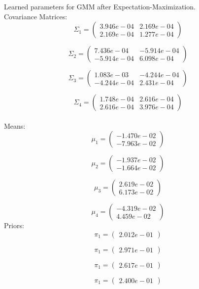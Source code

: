 \documentclass[conference]{IEEEtran}
\begin{document}
\begin{flushleft}
Learned parameters for GMM after Expectation-Maximization.\\

Covariance Matrices:
$$
\Sigma_1 =
 \begin{pmatrix}
    3.946e-04 & 2.169e-04\\
	2.169e-04 & 1.277e-04
 \end{pmatrix}
$$

$$
\Sigma_2 =
 \begin{pmatrix}
    7.436e-04 & -5.914e-04\\
	-5.914e-04 & 6.098e-04
 \end{pmatrix}
$$

$$
\Sigma_3 =
 \begin{pmatrix}
	1.083e-03 & -4.244e-04\\
	-4.244e-04 & 2.431e-04
 \end{pmatrix}
$$

$$
\Sigma_4 =
 \begin{pmatrix}
	1.748e-04 & 2.616e-04\\
	2.616e-04 & 3.976e-04
 \end{pmatrix}
$$
\\
Means:
$$
\mu_1 =
 \begin{pmatrix}
	-1.470e-02 \\ -7.963e-02
 \end{pmatrix}
$$

$$
\mu_2 =
 \begin{pmatrix}
	-1.937e-02 \\ -1.664e-02
 \end{pmatrix}
$$

$$
\mu_3 =
 \begin{pmatrix}
	2.619e-02 \\ 6.173e-02
 \end{pmatrix}
$$

$$
\mu_4 =
 \begin{pmatrix}
	-4.319e-02 \\ 4.459e-02
 \end{pmatrix}
$$
Priors:
$$ \pi_1 = \begin{pmatrix} 2.012e-01 \end{pmatrix} $$

$$ \pi_1 = \begin{pmatrix} 2.971e-01 \end{pmatrix} $$

$$ \pi_1 = \begin{pmatrix} 2.617e-01 \end{pmatrix} $$

$$ \pi_1 = \begin{pmatrix} 2.400e-01 \end{pmatrix} $$
\end{flushleft}
\end{document}
